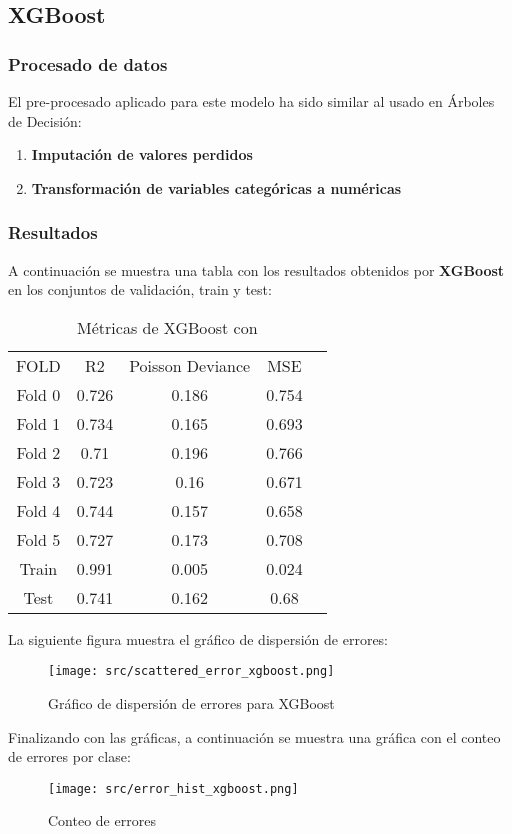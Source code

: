\subsection{XGBoost}

\subsubsection*{Procesado de datos}
El pre-procesado aplicado para este modelo ha sido similar al usado en Árboles de Decisión:
\begin{enumerate}
	\item \textbf{Imputación de valores perdidos}
	\item \textbf{Transformación de variables categóricas a numéricas}
\end{enumerate}
\subsubsection*{Resultados}
A continuación se muestra una tabla con los resultados obtenidos por \textbf{XGBoost} en los conjuntos de validación, train y test:
\begin{table}[H]
	\centering
	\begin{tabular}{|c|c|c|c|c|}
		\cline{1-4}
		FOLD   & R2    & Poisson Deviance & MSE   \\ \cline{1-4}
		Fold 0 & 0.726 & 0.186            & 0.754 \\ \cline{1-4}
		Fold 1 & 0.734 & 0.165            & 0.693 \\ \cline{1-4}
		Fold 2 & 0.71  & 0.196            & 0.766 \\ \cline{1-4}
		Fold 3 & 0.723 & 0.16             & 0.671 \\ \cline{1-4}
		Fold 4 & 0.744 & 0.157            & 0.658 \\ \cline{1-4}
		Fold 5 & 0.727 & 0.173            & 0.708 \\ \cline{1-4}
		Train  & 0.991 & 0.005            & 0.024 \\ \cline{1-4}
		Test   & 0.741 & 0.162            & 0.68  \\ \cline{1-4}
	\end{tabular}
	\caption{Métricas de XGBoost con}
	\label{tab:xgboost}
\end{table}
La siguiente figura muestra el gráfico de dispersión de errores:
\begin{figure}[H]
	\centering
	\texttt{[image: src/scattered\_error\_xgboost.png]}
	\caption{Gráfico de dispersión de errores para XGBoost}
	\label{fig:xgboost_scattered}
\end{figure}
Finalizando con las gráficas, a continuación se muestra una gráfica con el conteo de errores por clase:
\begin{figure}[H]
	\centering
	\texttt{[image: src/error\_hist\_xgboost.png]}
	\caption{Conteo de errores}
	\label{fig:xgboost_error_plot}
\end{figure}

